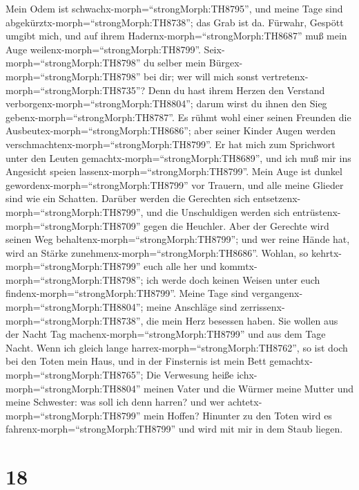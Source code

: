  Mein Odem ist schwachx-morph=``strongMorph:TH8795'', und
meine Tage sind abgekürztx-morph=``strongMorph:TH8738''; das Grab ist
da.  Fürwahr, Gespött umgibt mich, und auf ihrem
Hadernx-morph=``strongMorph:TH8687'' muß mein Auge
weilenx-morph=``strongMorph:TH8799''. 
Seix-morph=``strongMorph:TH8798'' du selber mein
Bürgex-morph=``strongMorph:TH8798'' bei dir; wer will mich sonst
vertretenx-morph=``strongMorph:TH8735''?  Denn du hast ihrem
Herzen den Verstand verborgenx-morph=``strongMorph:TH8804''; darum wirst
du ihnen den Sieg gebenx-morph=``strongMorph:TH8787''.  Es
rühmt wohl einer seinen Freunden die
Ausbeutex-morph=``strongMorph:TH8686''; aber seiner Kinder Augen werden
verschmachtenx-morph=``strongMorph:TH8799''.  Er hat mich
zum Sprichwort unter den Leuten gemachtx-morph=``strongMorph:TH8689'',
und ich muß mir ins Angesicht speien
lassenx-morph=``strongMorph:TH8799''.  Mein Auge ist dunkel
gewordenx-morph=``strongMorph:TH8799'' vor Trauern, und alle meine
Glieder sind wie ein Schatten.  Darüber werden die Gerechten
sich entsetzenx-morph=``strongMorph:TH8799'', und die Unschuldigen
werden sich entrüstenx-morph=``strongMorph:TH8709'' gegen die Heuchler.
 Aber der Gerechte wird seinen Weg
behaltenx-morph=``strongMorph:TH8799''; und wer reine Hände hat, wird an
Stärke zunehmenx-morph=``strongMorph:TH8686''.  Wohlan, so
kehrtx-morph=``strongMorph:TH8799'' euch alle her und
kommtx-morph=``strongMorph:TH8798''; ich werde doch keinen Weisen unter
euch findenx-morph=``strongMorph:TH8799''.  Meine Tage sind
vergangenx-morph=``strongMorph:TH8804''; meine Anschläge sind
zerrissenx-morph=``strongMorph:TH8738'', die mein Herz besessen haben.
 Sie wollen aus der Nacht Tag
machenx-morph=``strongMorph:TH8799'' und aus dem Tage Nacht.
 Wenn ich gleich lange harrex-morph=``strongMorph:TH8762'',
so ist doch bei den Toten mein Haus, und in der Finsternis ist mein Bett
gemachtx-morph=``strongMorph:TH8765'';  Die Verwesung heiße
ichx-morph=``strongMorph:TH8804'' meinen Vater und die Würmer meine
Mutter und meine Schwester:  was soll ich denn harren? und
wer achtetx-morph=``strongMorph:TH8799'' mein Hoffen? 
Hinunter zu den Toten wird es fahrenx-morph=``strongMorph:TH8799'' und
wird mit mir in dem Staub liegen.

\hypertarget{section-17}{%
\section{18}\label{section-17}}

